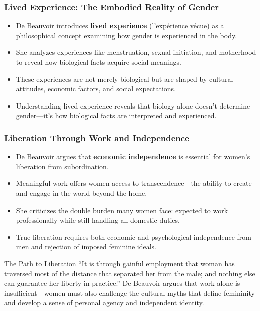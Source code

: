\documentclass[aspectratio=169]{beamer}
\begin{document}
		\begin{frame}
			\frametitle{Lived Experience: The Embodied Reality of Gender}
			\begin{itemize}
				\item De Beauvoir introduces \textbf{lived experience} (l'expérience vécue) as a philosophical concept examining how gender is experienced in the body.
				\item She analyzes experiences like menstruation, sexual initiation, and motherhood to reveal how biological facts acquire social meanings.
				\item These experiences are not merely biological but are shaped by cultural attitudes, economic factors, and social expectations.
				\item Understanding lived experience reveals that biology alone doesn't determine gender—it's how biological facts are interpreted and experienced.
			\end{itemize}
			
		\end{frame}
		
		\begin{frame}
			\frametitle{Liberation Through Work and Independence}
			\begin{itemize}
				\item De Beauvoir argues that \textbf{economic independence} is essential for women's liberation from subordination.
				\item Meaningful work offers women access to transcendence—the ability to create and engage in the world beyond the home.
				\item She criticizes the double burden many women face: expected to work professionally while still handling all domestic duties.
				\item True liberation requires both economic and psychological independence from men and rejection of imposed feminine ideals.
			\end{itemize}
			
			\begin{alertblock}{The Path to Liberation}
				``It is through gainful employment that woman has traversed most of the distance that separated her from the male; and nothing else can guarantee her liberty in practice.'' De Beauvoir argues that work alone is insufficient—women must also challenge the cultural myths that define femininity and develop a sense of personal agency and independent identity.
			\end{alertblock}
		\end{frame}
		
\end{document}
